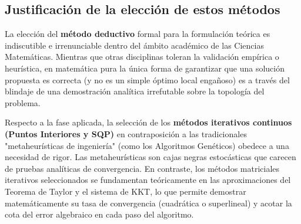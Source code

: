 \subsection{Justificación de la elección de estos métodos}
La elección del \textbf{método deductivo} formal para la formulación teórica es indiscutible e irrenunciable dentro del ámbito académico de las Ciencias Matemáticas. Mientras que otras disciplinas toleran la validación empírica o heurística, en matemática pura la única forma de garantizar que una solución propuesta es correcta (y no es un simple óptimo local engañoso) es a través del blindaje de una demostración analítica irrefutable sobre la topología del problema.

Respecto a la fase aplicada, la selección de los \textbf{métodos iterativos continuos (Puntos Interiores y SQP)} en contraposición a las tradicionales "metaheurísticas de ingeniería" (como los Algoritmos Genéticos) obedece a una necesidad de rigor. Las metaheurísticas son cajas negras estocásticas que carecen de pruebas analíticas de convergencia. En contraste, los métodos matriciales iterativos seleccionados se fundamentan teóricamente en las aproximaciones del Teorema de Taylor y el sistema de KKT, lo que permite demostrar matemáticamente su tasa de convergencia (cuadrática o superlineal) y acotar la cota del error algebraico en cada paso del algoritmo.
